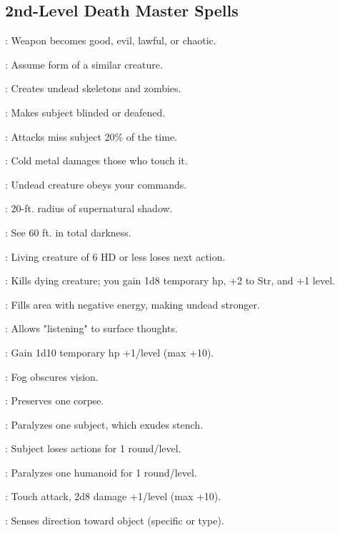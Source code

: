 \begin{multicols}{2}
\subsection{2nd-Level Death Master Spells}
\begin{description*}
\item[\linkspell{Align Weapon}:] Weapon becomes good, evil, lawful, or chaotic.
\item[\linkspell{Alter Self}:] Assume form of a similar creature.
\item[\linkspell{Animate Dead}:] Creates undead skeletons and zombies.
\item[\linkspell{Blindness/Deafness}:] Makes subject blinded or deafened.
\item[\linkspell{Blur}:] Attacks miss subject 20\% of the time.
\item[\linkspell{Chill Metal}:] Cold metal damages those who touch it.
\item[\linkspell{Command Undead}:] Undead creature obeys your commands.
\item[\linkspell{Darkness}:] 20-ft. radius of supernatural shadow.
\item[\linkspell{Darkvision}:] See 60 ft. in total darkness.
\item[\linkspell{Daze Monster}:] Living creature of 6 HD or less loses next action.
\item[\linkspell{Death Knell}:] Kills dying creature; you gain 1d8 temporary hp, +2 to Str, and +1 level.
\item[\linkspell{Desecrate}:] Fills area with negative energy, making undead stronger.
\item[\linkspell{Detect Thoughts}:] Allows "listening" to surface thoughts.
\item[\linkspell{False Life}:] Gain 1d10 temporary hp +1/level (max +10).
\item[\linkspell{Fog Cloud}:] Fog obscures vision.
\item[\linkspell{Gentle Repose}:] Preserves one corpse.
\item[\linkspell{Ghoul Touch}:] Paralyzes one subject, which exudes stench.
\item[\linkspell{Tasha's Hideous Laughter}:] Subject loses actions for 1 round/level.
\item[\linkspell{Hold Person}:] Paralyzes one humanoid for 1 round/level.
\item[\linkspell{Inflict Moderate Wounds}:] Touch attack, 2d8 damage +1/level (max +10).
\item[\linkspell{Locate Object}:] Senses direction toward object (specific or type).

\end{description*}
\end{multicols}
